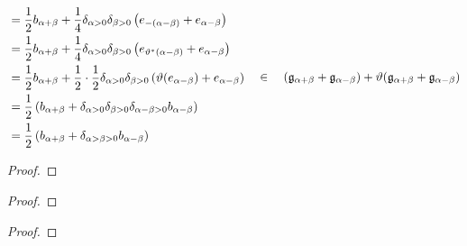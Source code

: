 \begin{itemize}
$$\begin{aligned}
                        & = \frac12 b_{\alpha + \beta} + \frac14 \delta_{\alpha > 0} \delta_{\beta > 0} \left( e_{-(\alpha - \beta)} + e_{\alpha - \beta} \right)
                        \\
                        & = \frac12 b_{\alpha + \beta} + \frac14 \delta_{\alpha > 0} \delta_{\beta > 0} \left( e_{\vartheta^*(\alpha - \beta)} + e_{\alpha - \beta} \right)
                        \\
                        & = \frac12 b_{\alpha + \beta} + \frac12 \cdot \frac12 \delta_{\alpha > 0} \delta_{\beta > 0} \left( \vartheta( e_{\alpha - \beta} ) + e_{\alpha - \beta} \right)
                        \\
                        & = \frac12 \left( b_{\alpha + \beta} + \delta_{\alpha > 0} \delta_{\beta > 0} \delta_{\alpha - \beta > 0} b_{\alpha - \beta} \right)
                        \\
                        & = \frac12 \left( b_{\alpha + \beta} + \delta_{\alpha > \beta > 0} b_{\alpha - \beta} \right)
                    \end{aligned}
                    \quad \in \quad ( \mathfrak{g}_{\alpha + \beta} + \mathfrak{g}_{\alpha - \beta} ) + \vartheta( \mathfrak{g}_{\alpha + \beta} + \mathfrak{g}_{\alpha - \beta} )
                $$
        \end{itemize}
        
        
        \begin{proposition} \label{prop: constructing_pseudo_fixed_point_subalgebras}
            
        \end{proposition}
            \begin{proof}
                
            \end{proof}
        \begin{corollary} \label{coro: pseudo_iwasawa_decompositions}
            
        \end{corollary}
            \begin{proof}
                
            \end{proof}
        \begin{corollary} \label{coro: adjoint_actions_of_pseudo_fixed_point_subalgebras}
        \end{corollary}
            \begin{proof}
                
            \end{proof}

